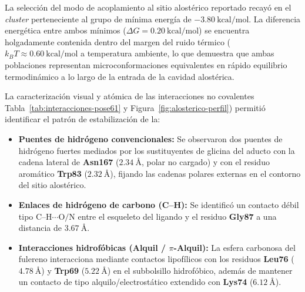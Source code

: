 La selección del modo de acoplamiento al sitio alostérico reportado recayó en el \textit{cluster} perteneciente al grupo de mínima energía de $-3.80\ \text{kcal/mol}$. La diferencia energética entre ambos mínimos ($\Delta G = 0.20\ \text{kcal/mol}$) se encuentra holgadamente contenida dentro del margen del ruido térmico ($k_B T \approx 0.60\ \text{kcal/mol}$ a temperatura ambiente, lo que demuestra que ambas poblaciones representan microconformaciones equivalentes en rápido equilibrio termodinámico a lo largo de la entrada de la cavidad alostérica.

La caracterización visual y atómica de las interacciones no covalentes Tabla~\ref{tab:interacciones-pose61} y Figura~\ref{fig:alosterico-perfil}) permitió identificar el patrón de estabilización de la:

\begin{itemize}
    \item \textbf{Puentes de hidrógeno convencionales:} Se observaron dos puentes de hidrógeno fuertes mediados por los sustituyentes de glicina del aducto con la cadena lateral de \textbf{Asn167} ($2.34\ \text{\AA}$, polar no cargado) y con el residuo aromático \textbf{Trp83} ($2.32\ \text{\AA}$), fijando las cadenas polares externas en el contorno del sitio alostérico.
    \item \textbf{Enlaces de hidrógeno de carbono (C--H):} Se identificó un contacto débil tipo $\text{C--H}\cdots\text{O/N}$ entre el esqueleto del ligando y el residuo \textbf{Gly87} a una distancia de $3.67\ \text{\AA}$.
    \item \textbf{Interacciones hidrofóbicas (Alquil / $\pi$-Alquil):} La esfera carbonosa del fulereno interacciona mediante contactos lipofílicos con los residuos \textbf{Leu76} ($4.78\ \text{\AA}$) y \textbf{Trp69} ($5.22\ \text{\AA}$) en el subbolsillo hidrofóbico, además de mantener un contacto de tipo alquilo/electrostático extendido con \textbf{Lys74} ($6.12\ \text{\AA}$).
\end{itemize}


